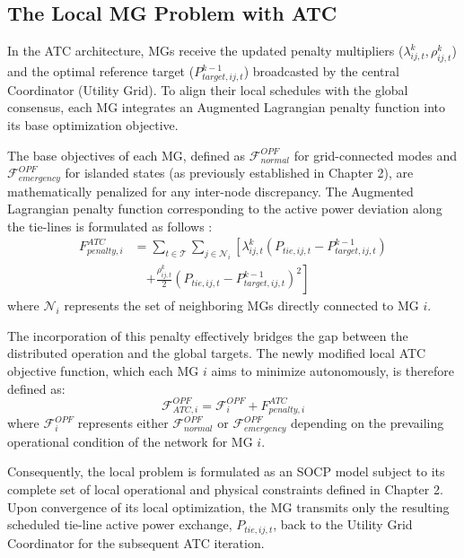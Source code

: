 \subsection{The Local MG Problem with ATC}
In the ATC architecture, MGs receive the updated penalty multipliers ($\lambda_{ij,t}^k, \rho_{ij,t}^k$) and the optimal reference target ($P_{target,ij,t}^{k-1}$) broadcasted by the central Coordinator (Utility Grid). To align their local schedules with the global consensus, each MG integrates an Augmented Lagrangian penalty function into its base optimization objective.

The base objectives of each MG, defined as $\mathcal{F}_{normal}^{OPF}$ for grid-connected modes and $\mathcal{F}_{emergency}^{OPF}$ for islanded states (as previously established in Chapter 2), are mathematically penalized for any inter-node discrepancy. The Augmented Lagrangian penalty function corresponding to the active power deviation along the tie-lines is formulated as follows \cite{ATC_Coopt_2025}:
\begin{equation} \label{eq:ATC_Penalty_Function}
\begin{aligned}
F_{penalty, i}^{ATC} &= \sum_{t \in \mathcal{T}} \sum_{j \in \mathcal{N}_i} \left[ \lambda_{ij,t}^k \left( P_{tie,ij,t} - P_{target,ij,t}^{k-1} \right) \right. \\
& \quad \left. + \frac{\rho_{ij,t}^k}{2} \left( P_{tie,ij,t} - P_{target,ij,t}^{k-1} \right)^2 \right]
\end{aligned}
\end{equation}
where $\mathcal{N}_i$ represents the set of neighboring MGs directly connected to MG $i$.

The incorporation of this penalty effectively bridges the gap between the distributed operation and the global targets. The newly modified local ATC objective function, which each MG $i$ aims to minimize autonomously, is therefore defined as:
\begin{equation} \label{eq:ATC_Global_Objective}
\mathcal{F}_{ATC, i}^{OPF} = \mathcal{F}_i^{OPF} + F_{penalty, i}^{ATC}
\end{equation}
where $\mathcal{F}_i^{OPF}$ represents either $\mathcal{F}_{normal}^{OPF}$ or $\mathcal{F}_{emergency}^{OPF}$ depending on the prevailing operational condition of the network for MG $i$.

Consequently, the local problem is formulated as an SOCP model subject to its complete set of local operational and physical constraints defined in Chapter 2. Upon convergence of its local optimization, the MG transmits only the resulting scheduled tie-line active power exchange, $P_{tie,ij,t}$, back to the Utility Grid Coordinator for the subsequent ATC iteration.

